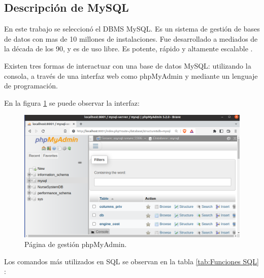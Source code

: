 \subsection{Descripción de MySQL}
\label{subsec: Bases de datos relacionales}

En este trabajo se seleccionó el DBMS MySQL. Es un sistema de gestión de bases de datos con mas de 10 millones de instalaciones. Fue desarrollado a mediados de la década de los 90, y es de uso libre. Es potente, rápido y altamente escalable \citep{BOOK:2}.

Existen tres formas de interactuar con una base de datos MySQL: utilizando la consola, a través de una interfaz web como phpMyAdmin y mediante un lenguaje de programación.

En la figura \ref{fig:Página phpMyAdmin} se puede observar la interfaz:
\pagebreak
 
\begin{figure}[ht]
	\centering
	\includegraphics[scale=.35]{./Figures/phpMyAdmin.png}
	\caption{Página de gestión phpMyAdmin.}
	\label{fig:Página phpMyAdmin}
\end{figure}

Los comandos más utilizados en SQL se observan en la tabla \ref{tab:Funciones SQL} \citep{BOOK:2}:

